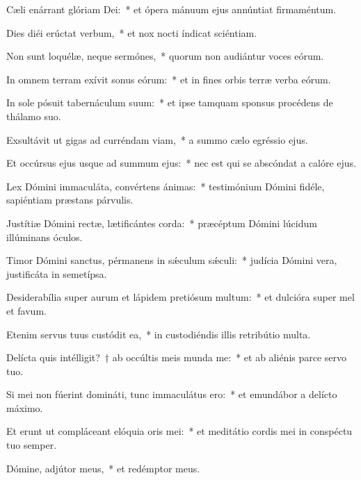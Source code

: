 \item Cæli enárrant glóriam Dei:~* et ópera mánuum ejus annúntiat firmaméntum.

\item Dies diéi erúctat verbum,~* et nox nocti índicat sciéntiam.

\item Non sunt loquélæ, neque sermónes,~* quorum non audiántur voces eórum.

\item In omnem terram exívit sonus eórum:~* et in fines orbis terræ verba eórum.

\item In sole pósuit tabernáculum suum:~* et ipse tamquam sponsus procédens de thálamo suo.

\item Exsultávit ut gigas ad curréndam viam,~* a summo cælo egréssio ejus.

\item Et occúrsus ejus usque ad summum ejus:~* nec est qui se abscóndat a calóre ejus.

\item Lex Dómini immaculáta, convértens ánimas:~* testimónium Dómini fidéle, sapiéntiam præstans párvulis.

\item Justítiæ Dómini rectæ, lætificántes corda:~* præcéptum Dómini lúcidum illúminans óculos.

\item Timor Dómini sanctus, pérmanens in sǽculum sǽculi:~* judícia Dómini vera, justificáta in semetípsa.

\item Desiderabília super aurum et lápidem pretiósum multum:~* et dulcióra super mel et favum.

\item Etenim servus tuus custódit ea,~* in custodiéndis illis retribútio multa.

\item Delícta quis intélligit?~† ab occúltis meis munda me:~* et ab aliénis parce servo tuo.

\item Si mei non fúerint domináti, tunc immaculátus ero:~* et emundábor a delícto máximo.

\item Et erunt ut compláceant elóquia oris mei:~* et meditátio cordis mei in conspéctu tuo semper.

\item Dómine, adjútor meus,~* et redémptor meus.
